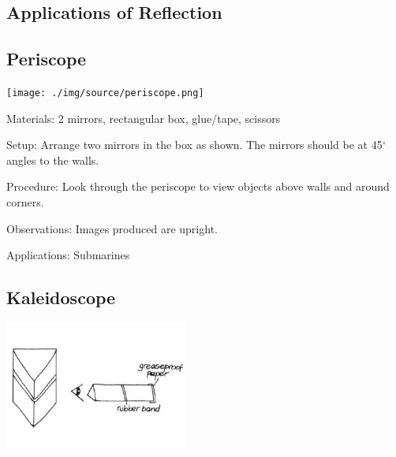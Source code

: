 \begin{multicols}{2}

\section*{Applications of Reflection}


\subsection{Periscope} \label{sub:i-periscope}

\begin{center}
\texttt{[image: ./img/source/periscope.png]}
\end{center}

\begin{description*}
\item[Materials:]{2 mirrors, rectangular box, glue/tape, scissors}
\item[Setup:]{Arrange two mirrors in the box as shown. The mirrors should be at 45$^\circ$ angles to the walls. }
\item[Procedure:]{Look through the periscope to view objects above walls and around corners.}
\item[Observations:]{Images produced are upright.}
\item[Applications:]{Submarines}
\end{description*}

\vfill
\columnbreak

\subsection{Kaleidoscope}

\begin{center}
\includegraphics[width=0.45\textwidth]{./img/vso/kaleidoscope.jpg}
\end{center}


\end{multicols}
